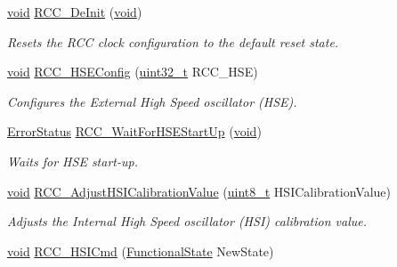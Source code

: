 \begin{DoxyCompactItemize}
\item 
\hyperlink{usb__devapi_8h_afabf60e7f57651d6d595a02c75f07cd0}{void} \hyperlink{group___r_c_c___private___functions_ga413f6422be11b1334abe60b3bff2e062}{R\+C\+C\+\_\+\+De\+Init} (\hyperlink{usb__devapi_8h_afabf60e7f57651d6d595a02c75f07cd0}{void})
\begin{DoxyCompactList}\small\item\em Resets the R\+CC clock configuration to the default reset state. \end{DoxyCompactList}\item 
\hyperlink{usb__devapi_8h_afabf60e7f57651d6d595a02c75f07cd0}{void} \hyperlink{group___r_c_c___private___functions_ga432b3281546d23345642d55f8670a93d}{R\+C\+C\+\_\+\+H\+S\+E\+Config} (\hyperlink{_p_e___types_8h_a33594304e786b158f3fb30289278f5af}{uint32\+\_\+t} R\+C\+C\+\_\+\+H\+SE)
\begin{DoxyCompactList}\small\item\em Configures the External High Speed oscillator (H\+SE). \end{DoxyCompactList}\item 
\hyperlink{agilefox_2library_2inc_2stm32f10x__type_8h_a8333b96c67f83cba354b3407fcbb6ee8}{Error\+Status} \hyperlink{group___r_c_c___private___functions_gae0f15692614dd048ee4110a056f001dc}{R\+C\+C\+\_\+\+Wait\+For\+H\+S\+E\+Start\+Up} (\hyperlink{usb__devapi_8h_afabf60e7f57651d6d595a02c75f07cd0}{void})
\begin{DoxyCompactList}\small\item\em Waits for H\+SE start-\/up. \end{DoxyCompactList}\item 
\hyperlink{usb__devapi_8h_afabf60e7f57651d6d595a02c75f07cd0}{void} \hyperlink{group___r_c_c___private___functions_gaa2d6a35f5c2e0f86317c3beb222677fc}{R\+C\+C\+\_\+\+Adjust\+H\+S\+I\+Calibration\+Value} (\hyperlink{_p_e___types_8h_aba7bc1797add20fe3efdf37ced1182c5}{uint8\+\_\+t} H\+S\+I\+Calibration\+Value)
\begin{DoxyCompactList}\small\item\em Adjusts the Internal High Speed oscillator (H\+SI) calibration value. \end{DoxyCompactList}\item 
\hyperlink{usb__devapi_8h_afabf60e7f57651d6d595a02c75f07cd0}{void} \hyperlink{group___r_c_c___private___functions_ga0c6772a1e43765909495f57815ef69e2}{R\+C\+C\+\_\+\+H\+S\+I\+Cmd} (\hyperlink{agilefox_2library_2inc_2stm32f10x__type_8h_ac9a7e9a35d2513ec15c3b537aaa4fba1}{Functional\+State} New\+State)

\end{DoxyCompactItemize}
